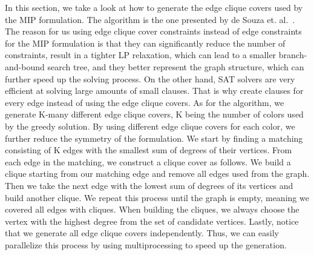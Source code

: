 In this section, we take a look at how to generate the edge clique covers used by the MIP formulation. The algorithm is the one presented by de Souza et. al.~\cite{zambon2014exact}. The reason for us using edge clique cover constraints instead of edge constraints for the MIP formulation is that they can significantly reduce the number of constraints, result in a tighter LP relaxation, which can lead to a smaller branch-and-bound search tree, and they better represent the graph structure, which can further speed up the solving process. On the other hand, SAT solvers are very efficient at solving large amounts of small clauses. That is why create clauses for every edge instead of using the edge clique covers. 
As for the algorithm, we generate K-many different edge clique covers, K being the number of colors used by the greedy solution. By using different edge clique covers for each color, we further reduce the symmetry of the formulation. We start by finding a matching consisting of K edges with the smallest sum of degrees of their vertices. From each edge in the matching, we construct a clique cover as follows. We build a clique starting from our matching edge and remove all edges used from the graph. Then we take the next edge with the lowest sum of degrees of its vertices and build another clique. We repeat this process until the graph is empty, meaning we covered all edges with cliques. When building the cliques, we always choose the vertex with the highest degree from the set of candidate vertices. Lastly, notice that we generate all edge clique covers independently. Thus, we can easily parallelize this process by using multiprocessing to speed up the generation.

